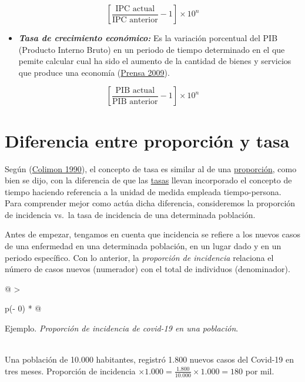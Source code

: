 \documentclass[
  11pt,
]{book}
\providecommand{\tightlist}{%
  \setlength{\itemsep}{0pt}\setlength{\parskip}{0pt}}
\begin{document}
\[\begin{equation}
\left[\frac{\text{IPC actual}}{\text{IPC anterior}}-1\right]\times 10^{n}
\end{equation}\]

\begin{itemize}
\tightlist
\item
  \textbf{\emph{Tasa de crecimiento económico:}} Es la variación porcentual del PIB (Producto Interno Bruto) en un periodo de tiempo determinado en el que pemite calcular cual ha sido el aumento de la cantidad de bienes y servicios que produce una economía (\protect\hyperlink{ref-de2009producto}{Prensa 2009}).
\end{itemize}

\[\begin{equation}
\left[\frac{\text{PIB actual}}{\text{PIB anterior}}-1\right]\times 10^{n}
\end{equation}\]

\hypertarget{diferencia-entre-proporciuxf3n-y-tasa}{%
\chapter{Diferencia entre proporción y tasa}\label{diferencia-entre-proporciuxf3n-y-tasa}}

Según (\protect\hyperlink{ref-colimon1990fundamentos}{Colimon 1990}), el concepto de tasa es similar al de una \protect\hyperlink{proporciuxf3n}{proporción}, como bien se dijo, con la diferencia de que las \protect\hyperlink{tasas}{tasas} llevan incorporado el concepto de tiempo haciendo referencia a la unidad de medida empleada tiempo-persona. Para comprender mejor como actúa dicha diferencia, consideremos la proporción de incidencia vs.~la tasa de incidencia de una determinada población.

Antes de empezar, tengamos en cuenta que incidencia se refiere a los nuevos casos de una enfermedad en una determinada población, en un lugar dado y en un periodo específico. Con lo anterior, la \emph{proporción de incidencia} relaciona el número de casos nuevos (numerador) con el total de individuos (denominador).

\begin{longtable}[]{@{}
  >{\raggedright\arraybackslash}p{(\columnwidth - 0\tabcolsep) * }@{}}
\toprule
\begin{minipage}[b]{\linewidth}\raggedright
Ejemplo. \emph{Proporción de incidencia de covid-19 en una población}.
\end{minipage} \\
\midrule
\endhead
Una población de 10.000 habitantes, registró 1.800 nuevos casos del Covid-19 en tres meses. Proporción de incidencia \(\times 1.000=\frac{1.800}{10.000}\times 1.000=180\) por mil. \\
\bottomrule
\end{longtable}
\end{document}

